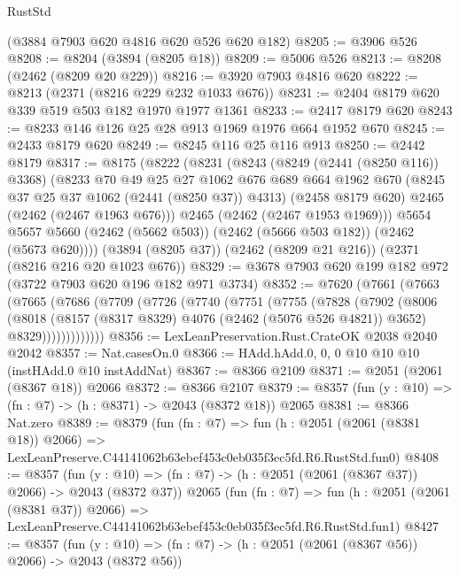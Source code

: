 \begin{lexlean}{RustStd}
\begin{coremodule}
    (@3884 @7903 @620 @4816 @620 @526 @620 @182)
@8205 := @3906 @526
@8208 := @8204 (@3894 (@8205 @18))
@8209 := @5006 @526
@8213 := @8208 (@2462 (@8209 @20 @229))
@8216 := @3920 @7903 @4816 @620
@8222 := @8213 (@2371 (@8216 @229 @232 @1033 @676))
@8231 := @2404 @8179 @620 @339 @519 @503 @182 @1970 @1977 @1361
@8233 := @2417 @8179 @620
@8243 := @8233 @146 @126 @25 @28 @913 @1969 @1976 @664 @1952 @670
@8245 := @2433 @8179 @620
@8249 := @8245 @116 @25 @116 @913
@8250 := @2442 @8179
@8317 := @8175
    (@8222
      (@8231
        (@8243
          (@8249 (@2441 (@8250 @116)) @3368)
          (@8233
            @70
            @49
            @25
            @27
            @1062
            @676
            @689
            @664
            @1962
            @670
            (@8245 @37 @25 @37 @1062 (@2441 (@8250 @37)) @4313)
            (@2458 @8179 @620)
            @2465
            (@2462 (@2467 @1963 @676)))
          @2465
          (@2462 (@2467 @1953 @1969)))
        @5654
        @5657
        @5660
        (@2462 (@5662 @503))
        (@2462 (@5666 @503 @182))
        (@2462 (@5673 @620))))
    (@3894 (@8205 @37))
    (@2462 (@8209 @21 @216))
    (@2371 (@8216 @216 @20 @1023 @676))
@8329 := @3678 @7903 @620 @199 @182 @972 (@3722 @7903 @620 @196 @182 @971 @3734)
@8352 := @7620
    (@7661
      (@7663
        (@7665
          (@7686
            (@7709
              (@7726
                (@7740
                  (@7751
                    (@7755
                      (@7828
                        (@7902
                          (@8006
                            (@8018
                              (@8157 (@8317 @8329) @4076 (@2462 (@5076 @526 @4821)) @3652)
                              @8329)))))))))))))
@8356 := LexLeanPreservation.Rust.CrateOK @2038 @2040 @2042
@8357 := Nat.casesOn.{0}
@8366 := HAdd.hAdd.{0, 0, 0} @10 @10 @10 (instHAdd.{0} @10 instAddNat)
@8367 := @8366 @2109
@8371 := @2051 (@2061 (@8367 @18)) @2066
@8372 := @8366 @2107
@8379 := @8357 (fun (y : @10) => (fn : @7) -> (h : @8371) -> @2043 (@8372 @18)) @2065
@8381 := @8366 Nat.zero
@8389 := @8379
    (fun (fn : @7) =>
    fun (h : @2051 (@2061 (@8381 @18)) @2066) =>
    LexLeanPreserve.C44141062b63ebef453c0eb035f3ec5fd.R6.RustStd.fun0)
@8408 := @8357
    (fun (y : @10) => (fn : @7) -> (h : @2051 (@2061 (@8367 @37)) @2066) -> @2043 (@8372 @37))
    @2065
    (fun (fn : @7) =>
    fun (h : @2051 (@2061 (@8381 @37)) @2066) =>
    LexLeanPreserve.C44141062b63ebef453c0eb035f3ec5fd.R6.RustStd.fun1)
@8427 := @8357
    (fun (y : @10) => (fn : @7) -> (h : @2051 (@2061 (@8367 @56)) @2066) -> @2043 (@8372 @56))

\end{coremodule}
\end{lexlean}
